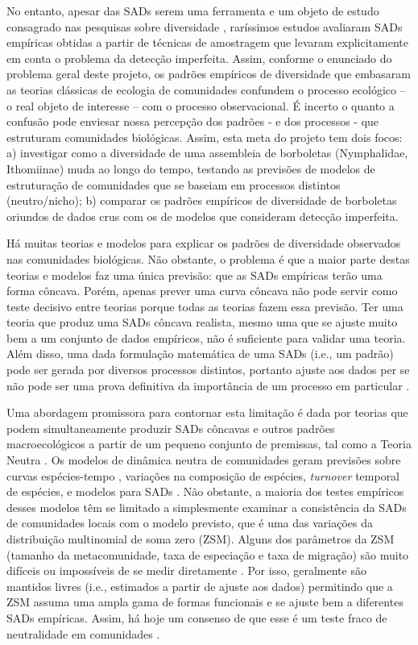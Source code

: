 \documentclass[12pt, A4]{article}
\begin{document}
No entanto, apesar das SADs serem uma ferramenta e um objeto de estudo
consagrado nas pesquisas sobre diversidade \citep{McGill2007}, 
raríssimos estudos avaliaram SADs empíricas
obtidas a partir de técnicas de amostragem que levaram explicitamente
em conta o problema da detecção imperfeita. Assim, conforme o
enunciado do problema geral deste projeto, os padrões empíricos de
diversidade que embasaram as teorias clássicas de ecologia de
comunidades confundem o processo ecológico – o real objeto de
interesse – com o processo observacional. É incerto o
quanto a confusão pode enviesar nossa percepção dos padrões - e dos
processos - que estruturam comunidades biológicas. Assim, esta meta do
projeto tem dois focos: a) investigar como a diversidade de uma
assembleia de borboletas (Nymphalidae, Ithomiinae) muda ao longo do
tempo, testando as previsões de modelos de estruturação de comunidades
que se baseiam em processos distintos (neutro/nicho);  b) comparar os
padrões empíricos de diversidade de borboletas oriundos de dados crus
com os de modelos que consideram detecção imperfeita. 

Há muitas teorias e modelos para explicar os padrões de diversidade
observados nas comunidades biológicas. Não obstante, o problema é que
a maior parte destas teorias e modelos faz uma única previsão: que as
SADs empíricas terão uma forma côncava. Porém, apenas prever uma curva
côncava não pode servir como teste decisivo entre teorias porque todas
as teorias fazem essa previsão. Ter uma teoria
que produz uma SADs côncava realista, mesmo uma que se ajuste muito bem
a um conjunto de dados empíricos, não é suficiente para validar uma
teoria. Além disso, uma dada formulação
matemática de uma SADs (i.e., um padrão) pode ser gerada por diversos
processos distintos, portanto ajuste aos dados per se não pode ser uma
prova definitiva da importância de um processo em particular 
\citep{Pielou1975,McGill2003}. 

Uma abordagem promissora para contornar esta limitação é dada por
teorias que podem simultaneamente produzir SADs côncavas e outros
padrões macroecológicos a partir de um pequeno conjunto de premissas, 
tal como a Teoria Neutra \citep{Caswell1976,Hubbell2001}. 
Os modelos de dinâmica neutra de comunidades geram previsões sobre
curvas espécies-tempo \citep{adler2005}, variações na composição de
espécies, \emph{turnover} temporal de espécies, e modelos para 
SADs \citep{Hubbell2001}. Não obstante, a maioria dos testes
empíricos desses modelos têm se limitado a simplesmente examinar a
consistência da SADs de comunidades locais com o modelo previsto,
que é uma das variações da distribuição multinomial de soma zero (ZSM). Alguns dos
parâmetros da ZSM (tamanho da
metacomunidade, taxa de especiação e taxa de migração) são muito
difíceis ou impossíveis de se medir diretamente
\citep{wootton2005}. Por isso, geralmente são mantidos livres (i.e., estimados a
partir de ajuste aos dados) permitindo que a ZSM assuma uma ampla gama
de formas funcionais e se ajuste bem a diferentes SADs empíricas. 
Assim, há hoje um consenso de que esse é um teste fraco de
neutralidade em comunidades \citep{McGill2003,leigh2007}. 
\end{document}
